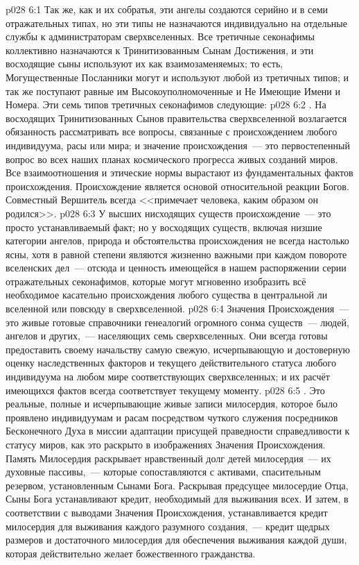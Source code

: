 \vs p028 6:1 Так же, как и их собратья, эти ангелы создаются серийно и в семи отражательных типах, но эти типы не назначаются индивидуально на отдельные службы к администраторам сверхвселенных. Все третичные секонафимы коллективно назначаются к Тринитизованным Сынам Достижения, и эти восходящие сыны используют их как взаимозаменяемых; то есть, Могущественные Посланники могут и используют любой из третичных типов; и так же поступают равные им Высокоуполномоченные и Не Имеющие Имени и Номера. Эти семь типов третичных секонафимов следующие:
\vs p028 6:2 . На восходящих Тринитизованных Сынов правительства сверхвселенной возлагается обязанность рассматривать все вопросы, связанные с происхождением любого индивидуума, расы или мира; и значение происхождения~--- это первостепенный вопрос во всех наших планах космического прогресса живых созданий миров. Все взаимоотношения и этические нормы вырастают из фундаментальных фактов происхождения. Происхождение является основой относительной реакции Богов. Совместный Вершитель всегда <<примечает человека, каким образом он родился>>.
\vs p028 6:3 У высших нисходящих существ происхождение~--- это просто устанавливаемый факт; но у восходящих существ, включая низшие категории ангелов, природа и обстоятельства происхождения не всегда настолько ясны, хотя в равной степени являются жизненно важными при каждом повороте вселенских дел~--- отсюда и ценность имеющейся в нашем распоряжении серии отражательных секонафимов, которые могут мгновенно изобразить всё необходимое касательно происхождения любого существа в центральной ли вселенной или повсюду в сверхвселенной.
\vs p028 6:4 Значения Происхождения~--- это живые готовые справочники генеалогий огромного сонма существ~--- людей, ангелов и других,~--- населяющих семь сверхвселенных. Они всегда готовы предоставить своему начальству самую свежую, исчерпывающую и достоверную оценку наследственных факторов и текущего действительного статуса любого индивидуума на любом мире соответствующих сверхвселенных; и их расчёт имеющихся фактов всегда соответствует текущему моменту.
\vs p028 6:5 . Это реальные, полные и исчерпывающие живые записи милосердия, которое было проявлено индивидуумам и расам посредством чуткого служения посредников Бесконечного Духа в миссии адаптации присущей праведности справедливости к статусу миров, как это раскрыто в изображениях Значения Происхождения. Память Милосердия раскрывает нравственный долг детей милосердия~--- их духовные пассивы,~--- которые сопоставляются с активами, спасительным резервом, установленным Сынами Бога. Раскрывая предсущее милосердие Отца, Сыны Бога устанавливают кредит, необходимый для выживания всех. И затем, в соответствии с выводами Значения Происхождения, устанавливается кредит милосердия для выживания каждого разумного создания,~--- кредит щедрых размеров и достаточного милосердия для обеспечения выживания каждой души, которая действительно желает божественного гражданства.
